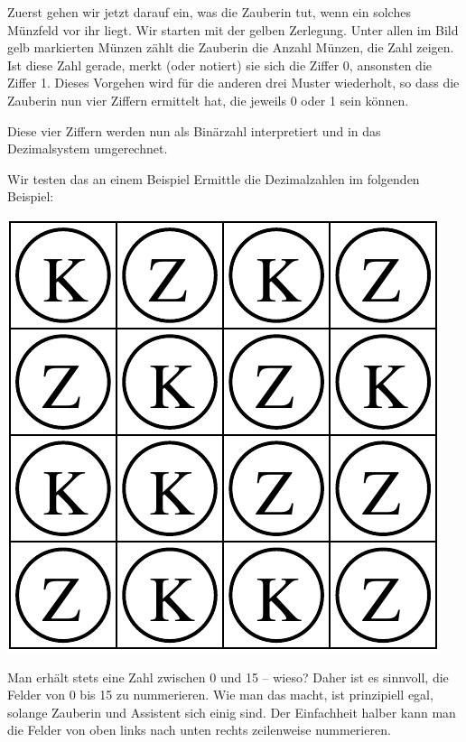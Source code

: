 \documentclass{uebungszettel}
\begin{document}
Zuerst gehen wir jetzt darauf ein, was die Zauberin tut, wenn ein solches Münzfeld vor ihr liegt.
Wir starten mit der gelben Zerlegung.
Unter allen im Bild gelb markierten Münzen zählt die Zauberin die Anzahl Münzen, die Zahl zeigen.
Ist diese Zahl gerade, merkt (oder notiert) sie sich die Ziffer 0, ansonsten die Ziffer 1.
Dieses Vorgehen wird für die anderen drei Muster wiederholt, so dass die Zauberin nun vier Ziffern  
ermittelt hat, die jeweils 0 oder 1 sein können.

Diese vier Ziffern werden nun als Binärzahl interpretiert und 
in das Dezimalsystem umgerechnet.

\begin{aufgabe}{Wir testen das an einem Beispiel}
 Ermittle die Dezimalzahlen im folgenden Beispiel:
 \begin{center}
 \includegraphics[scale = 0.4]{beispielbild}
\end{center}
 Man erhält stets eine Zahl zwischen 0 und 15 -- wieso?
 Daher ist es sinnvoll, die Felder von 0 bis 15 zu nummerieren. Wie man das macht, ist prinzipiell egal, solange Zauberin und Assistent sich einig sind.
 Der Einfachheit halber kann man die Felder von oben links nach unten rechts zeilenweise nummerieren.
\end{aufgabe}
\end{document}
